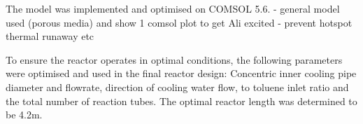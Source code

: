 
The model was implemented and optimised on COMSOL 5.6. 
- general model used (porous media) and show 1 comsol plot to get Ali excited
- prevent hotspot thermal runaway etc

To ensure the reactor operates in optimal conditions, the following parameters were optimised and used in the final reactor design: Concentric inner cooling pipe diameter and flowrate, direction of cooling water flow,  to toluene inlet ratio and the total number of reaction tubes. %
The optimal reactor length was determined to be 4.2m. 


